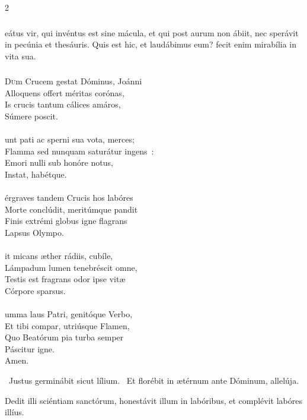 \documentclass[9pt,twoside]{extarticle}
\begin{document}
\begin{multicols}{2}
\subsubsection*{\center {}}
eátus vir, qui invéntus est sine mácula, et qui post aurum non ábiit, nec sperávit in pecúnia et thesáuris. Quis est hic, et laudábimus eum? fecit enim mirabília in vita sua.

\subsubsection*{\center{}}
\lettrine{D}um Crucem gestat Dóminus, Joánni\\ Alloquens offert méritas corónas,\\ Is crucis tantum cálices amáros,\\ Súmere poscit.\\
\\
unt pati ac sperni sua vota, merces;\\ Flamma sed nunquam saturátur ingens~:\\ Emori nulli sub honóre notus,\\ Instat, habétque.\\
\\
érgraves tandem Crucis hos labóres\\ Morte conclúdit, meritúmque pandit\\ Finis extrémi globus igne flagrans\\ Lapsus Olympo.\\
\\
it micans æther rádiis, cubíle,\\ Lámpadum lumen tenebréscit omne,\\ Testis est fragrans odor ipse vitæ\\ Córpore sparsus.\\
\\
umma laus Patri, genitóque Verbo,\\ Et tibi compar, utriúsque Flamen,\\ Quo Beatórum pia turba semper\\ Páscitur igne.\\
Amen.

\begin{tightlist}{}
\item {}~Justus germinábit sicut lílium. ~Et florébit in ætérnum ante Dóminum, allelúja.
\item {} Dedit illi sciéntiam sanctórum, honestávit illum in labóribus, et complévit labóres illíus.
\end{tightlist}


\end{multicols}
\end{document}
